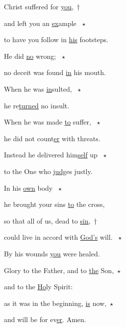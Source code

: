 \noindent Christ suffered for \uline{you},~†~\nopagebreak

and left you an \uline{ex}ample ~$\star$~\nopagebreak

to have you follow in \uline{his} footsteps.

\noindent He did \uline{no} wrong; ~$\star$~\nopagebreak

no deceit was found \uline{in} his mouth.

\noindent When he was \uline{in}sulted, ~$\star$~\nopagebreak

he re\uline{turned} no insult.

\noindent When he was made \uline{to} suffer, ~$\star$~\nopagebreak

he did not count\uline{er} with threats.

\noindent Instead he delivered him\uline{self} up ~$\star$~\nopagebreak

to the One who \uline{judg}es justly.

\noindent In his \uline{own} body ~$\star$~\nopagebreak

he brought your sins \uline{to} the cross,

\noindent so that all of us, dead to \uline{sin},~†~\nopagebreak

could live in accord with \uline{God’s} will. ~$\star$~\nopagebreak

By his wounds \uline{you} were healed.

\noindent Glory to the Father, and to \uline{the} Son,~$\star$~\nopagebreak

and to the \uline{Ho}ly Spirit:

\noindent as it was in the beginning, \uline{is} now,~$\star$~\nopagebreak

and will be for ev\uline{er}. Amen.
